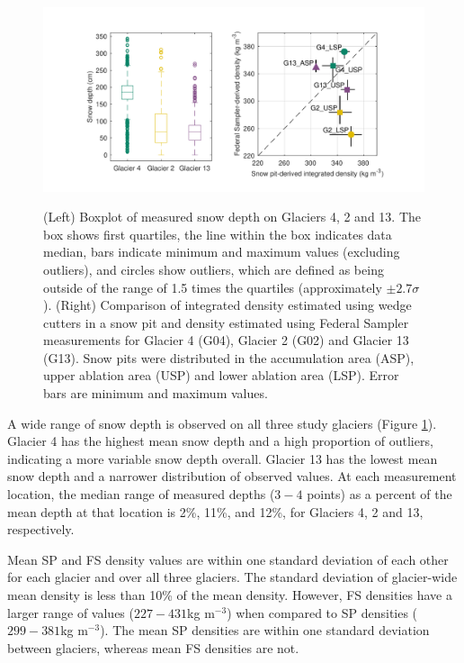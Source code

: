 \documentclass[review,oneside, letterpaper]{igs}
\begin{document}
\begin{figure}
	\centering
	\includegraphics[width =\textwidth]{DepthBoxplot_SPvsFS.pdf}\\
	\caption{(Left) Boxplot of measured snow depth on Glaciers 4, 2 and 13. The box shows first quartiles, the line within the box indicates data median, bars indicate minimum and maximum values (excluding outliers), and circles show outliers, which are defined as being outside of the range of 1.5 times the quartiles (approximately $\pm2.7\sigma$). (Right) Comparison of integrated density estimated using wedge cutters in a snow pit and density estimated using Federal Sampler measurements for Glacier 4 (G04), Glacier 2 (G02) and Glacier 13 (G13). Snow pits were distributed in the accumulation area (ASP), upper ablation area (USP) and lower ablation area (LSP). Error bars are minimum and maximum values.}
	\label{fig:DepthBoxplot_SPvsFS}
\end{figure}

A wide range of snow depth is observed on all three study glaciers (Figure \ref{fig:DepthBoxplot_SPvsFS}). Glacier 4 has the highest mean snow depth and a high proportion of outliers, indicating a more variable snow depth overall. Glacier 13 has the lowest mean snow depth and a narrower distribution of observed values. At each measurement location, the median range of measured depths ($3-4$ points) as a percent of the mean depth at that location is 2\%, 11\%, and 12\%, for Glaciers 4, 2 and 13, respectively. 

Mean SP and FS density values are within one standard deviation of each other for each glacier and over all three glaciers. The standard deviation of glacier-wide mean density is less than 10\% of the mean density. However, FS densities have a larger range of values ($227-431$kg m$^{-3}$) when compared to SP densities ($299-381$kg m$^{-3}$).  The mean SP densities are within one standard deviation between glaciers, whereas mean FS densities are not.
\end{document}
